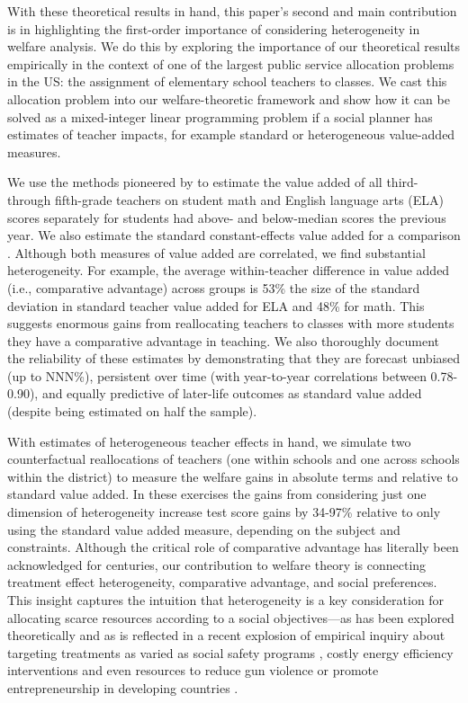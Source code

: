\documentclass[12pt]{article}
\theoremstyle{definition}
\theoremstyle{definition}
\theoremstyle{definition}
\theoremstyle{definition}
\begin{document}
With these theoretical results in hand, this paper's second and main contribution is in highlighting the first-order importance of considering heterogeneity in welfare analysis. We do this by exploring the importance of our theoretical results empirically in the context of one of the largest public service allocation problems in the US: the assignment of elementary school teachers to classes. We cast this allocation problem into our welfare-theoretic framework and show how it can be solved as a mixed-integer linear programming problem if a social planner has estimates of teacher impacts, for example standard or heterogeneous value-added measures.

We use the methods pioneered by \citet{Delgado2020} to estimate the value added of all third- through fifth-grade teachers on student math and English language arts (ELA) scores separately for students had above- and below-median scores the previous year. We also estimate the standard constant-effects value added for a comparison \citep{chetty2014measuring1}. Although both measures of value added are correlated, we find substantial heterogeneity. For example, the average within-teacher difference in value added (i.e., comparative advantage) across groups is 53\% the size of the standard deviation in standard teacher value added for ELA and 48\% for math. This suggests enormous gains from reallocating teachers to classes with more students they have a comparative advantage in teaching. We also thoroughly document the reliability of these estimates by demonstrating that they are forecast unbiased (up to NNN\%), persistent over time (with year-to-year correlations between 0.78-0.90), and equally predictive of later-life outcomes as standard value added (despite being estimated on half the sample).

With estimates of heterogeneous teacher effects in hand, we simulate two counterfactual reallocations of teachers (one within schools and one across schools within the district) to measure the welfare gains in absolute terms and relative to standard value added. In these exercises the gains from considering just one dimension of heterogeneity increase test score gains by 34-97\% relative to only using the standard value added measure, depending on the subject and constraints. Although the critical role of comparative advantage has literally been acknowledged for centuries, our contribution to welfare theory is connecting treatment effect heterogeneity, comparative advantage, and social preferences. This insight captures the intuition that heterogeneity is a key consideration for allocating scarce resources according to a social objectives---as has been explored theoretically \citep{kitagawa2018should,athey2021policy} and as is reflected in a recent explosion of empirical inquiry about targeting treatments as varied as social safety programs \citep{alatas2016self,finkelstein2019take}, costly energy efficiency interventions \citep{ito2021selection,ida2022choosing} and even resources to reduce gun violence \citep{bhatt2023predicting} or promote entrepreneurship in developing countries \citep{hussam2022targeting}.
\end{document}
